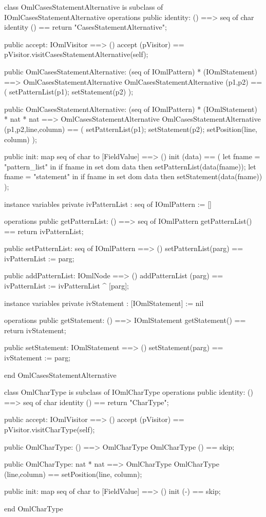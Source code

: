 \begin{vdm_al}
class OmlCasesStatementAlternative is subclass of IOmlCasesStatementAlternative
operations
  public identity: () ==> seq of char
  identity () == return "CasesStatementAlternative";

  public accept: IOmlVisitor ==> ()
  accept (pVisitor) == pVisitor.visitCasesStatementAlternative(self);

  public OmlCasesStatementAlternative:
    (seq of IOmlPattern) *
    (IOmlStatement) ==> OmlCasesStatementAlternative
  OmlCasesStatementAlternative (p1,p2) == 
    ( setPatternList(p1);
      setStatement(p2) );

  public OmlCasesStatementAlternative:
    (seq of IOmlPattern) *
    (IOmlStatement) *
    nat *
    nat ==> OmlCasesStatementAlternative
  OmlCasesStatementAlternative (p1,p2,line,column) == 
    ( setPatternList(p1);
      setStatement(p2);
      setPosition(line, column) );

  public init: map seq of char to [FieldValue] ==> ()
  init (data) ==
    ( let fname = "pattern_list" in
        if fname in set dom data
        then setPatternList(data(fname));
      let fname = "statement" in
        if fname in set dom data
        then setStatement(data(fname)) );

instance variables
  private ivPatternList : seq of IOmlPattern := []

operations
  public getPatternList: () ==> seq of IOmlPattern
  getPatternList() == return ivPatternList;

  public setPatternList: seq of IOmlPattern ==> ()
  setPatternList(parg) == ivPatternList := parg;

  public addPatternList: IOmlNode ==> ()
  addPatternList (parg) == ivPatternList := ivPatternList ^ [parg];

instance variables
  private ivStatement : [IOmlStatement] := nil

operations
  public getStatement: () ==> IOmlStatement
  getStatement() == return ivStatement;

  public setStatement: IOmlStatement ==> ()
  setStatement(parg) == ivStatement := parg;

end OmlCasesStatementAlternative
\end{vdm_al}

\begin{vdm_al}
class OmlCharType is subclass of IOmlCharType
operations
  public identity: () ==> seq of char
  identity () == return "CharType";

  public accept: IOmlVisitor ==> ()
  accept (pVisitor) == pVisitor.visitCharType(self);

  public OmlCharType:
    () ==> OmlCharType
  OmlCharType () == 
    skip;

  public OmlCharType:
    nat *
    nat ==> OmlCharType
  OmlCharType (line,column) == 
    setPosition(line, column);

  public init: map seq of char to [FieldValue] ==> ()
  init (-) == skip;

end OmlCharType
\end{vdm_al}

